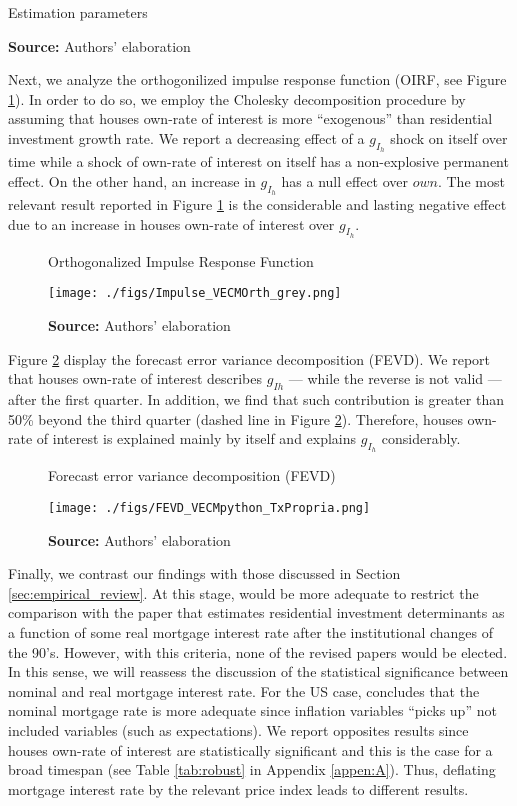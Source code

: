 \documentclass[12pt, a4paper]{article}
\begin{document}
\begin{table}[h!]
	\caption{Estimation parameters}
	\centering
	
	\caption*{\textbf{Source:} Authors' elaboration}
\end{table}
Next, we analyze the orthogonilized impulse response function (OIRF, see Figure \ref{irf}).
In order to do so, we employ the Cholesky decomposition procedure by assuming that houses own-rate of interest is more ``exogenous'' than residential investment growth rate.
We report a decreasing effect of a \(g_{I_h}\) shock on itself over time while a shock of own-rate of interest on itself has a non-explosive permanent effect.
On the other hand, an increase in \(g_{I_h}\) has a null effect over \(own\).
The most relevant result reported in Figure \ref{irf} is the considerable and lasting negative effect due to an increase in houses own-rate of interest over \(g_{I_h}\).

\begin{figure}[H]
	\centering
	\caption{Orthogonalized Impulse Response Function}
	\label{irf}
	\texttt{[image: ./figs/Impulse\_VECMOrth\_grey.png]}
	\caption*{\textbf{Source:} Authors' elaboration}
\end{figure}

Figure \ref{fevd} display the forecast error variance decomposition (FEVD).
We report that houses own-rate of interest describes \(g_{Ih}\) --- while the reverse is not valid --- after the first quarter.
In addition, we find that such contribution is greater than 50\% beyond the third quarter (dashed line in Figure \ref{fevd}).
Therefore, houses own-rate of interest is explained mainly by itself and explains \(g_{I_h}\) considerably.

\begin{figure}[H]
	\centering
	\caption{Forecast error variance decomposition (FEVD)}
	\label{fevd}
	\texttt{[image: ./figs/FEVD\_VECMpython\_TxPropria.png]}
	\caption*{\textbf{Source:} Authors' elaboration}
\end{figure}


Finally,  we contrast our findings with those discussed in Section \ref{sec:empirical_review}.
At this stage, would be more adequate to restrict the comparison with the paper that estimates residential investment determinants as a function of some real mortgage interest rate after the institutional changes of the 90's.
However, with this criteria, none of the revised papers would be elected.
In this sense, we will reassess the discussion of the statistical significance between nominal and real mortgage interest rate.
For the US case, \textcite{fair_macroeconometric_2018} concludes that the nominal mortgage rate is more adequate since inflation variables ``picks up'' not included variables (such as expectations).
We report opposites results since houses own-rate of interest are statistically significant and this is the case for a broad timespan (see Table \ref{tab:robust} in Appendix \ref{appen:A}).
Thus, deflating mortgage interest rate by the relevant price index leads to different results.
\end{document}
